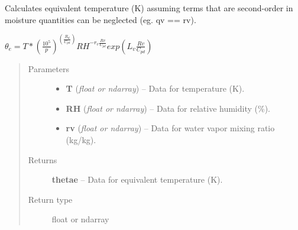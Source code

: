 \documentclass[letterpaper,10pt,english]{sphinxmanual}
\begin{document}

\begin{fulllineitems}
\label{atmos:atmos.equations.thetae_from_T_RH_rv_lwv}
Calculates equivalent temperature (K) assuming terms that are second-order in
moisture quantities can be neglected (eg. qv == rv).

\(\theta_e = T*(\frac{10^5}{p})^(\frac{R_d}{C_{pd}}) RH^{-r_v
\frac{Rv}{C_{pd}}} exp(L_v \frac{Rv}{C_{pd}})\)
\begin{quote}\begin{description}
\item[{Parameters}] \leavevmode\begin{itemize}
\item {} 
\textbf{T} (\emph{float or ndarray}) -- Data for temperature (K).

\item {} 
\textbf{RH} (\emph{float or ndarray}) -- Data for relative humidity (\%).

\item {} 
\textbf{rv} (\emph{float or ndarray}) -- Data for water vapor mixing ratio (kg/kg).

\end{itemize}

\item[{Returns}] \leavevmode
\textbf{thetae} --
Data for equivalent temperature (K).

\item[{Return type}] \leavevmode
float or ndarray

\end{description}\end{quote}

\end{fulllineitems}

\end{document}
